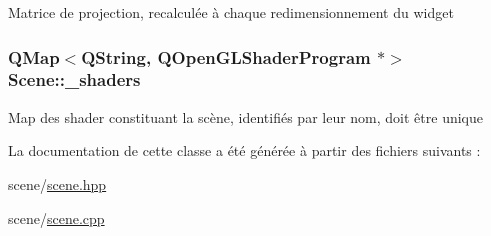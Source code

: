 Matrice de projection, recalculée à chaque redimensionnement du widget \hypertarget{class_scene_abde34dc03c8d3a07b3177041ab195f07}{
\subsubsection[{\+\_\+shaders}]{\setlength{\rightskip}{0pt plus 5cm}Q\+Map$<$Q\+String, Q\+Open\+G\+L\+Shader\+Program $\ast$$>$ Scene\+::\+\_\+shaders\hspace{0.3cm}{\ttfamily [private]}}}\label{class_scene_abde34dc03c8d3a07b3177041ab195f07}
Map des shader constituant la scène, identifiés par leur nom, doit être unique 

La documentation de cette classe a été générée à partir des fichiers suivants \+:\begin{DoxyCompactItemize}
\item 
scene/\hyperlink{scene_8hpp}{scene.\+hpp}\item 
scene/\hyperlink{scene_8cpp}{scene.\+cpp}\end{DoxyCompactItemize}
